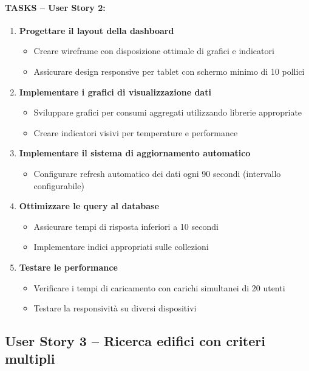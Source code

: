 \paragraph*{TASKS – User Story 2:}
\begin{enumerate}
    \item \textbf{Progettare il layout della dashboard}
    \begin{itemize}
        \item Creare wireframe con disposizione ottimale di grafici e indicatori
        \item Assicurare design responsive per tablet con schermo minimo di 10 pollici
    \end{itemize}
    \item \textbf{Implementare i grafici di visualizzazione dati}
    \begin{itemize}
        \item Sviluppare grafici per consumi aggregati utilizzando librerie appropriate
        \item Creare indicatori visivi per temperature e performance
    \end{itemize}
    \item \textbf{Implementare il sistema di aggiornamento automatico}
    \begin{itemize}
        \item Configurare refresh automatico dei dati ogni 90 secondi (intervallo configurabile)
    \end{itemize}
    \item \textbf{Ottimizzare le query al database}
    \begin{itemize}
        \item Assicurare tempi di risposta inferiori a 10 secondi
        \item Implementare indici appropriati sulle collezioni
    \end{itemize}
    \item \textbf{Testare le performance}
    \begin{itemize}
        \item Verificare i tempi di caricamento con carichi simultanei di 20 utenti
        \item Testare la responsività su diversi dispositivi
    \end{itemize}
\end{enumerate}


\subsection{User Story 3 – Ricerca edifici con criteri multipli}
\label{us:ricercaEdifici}

